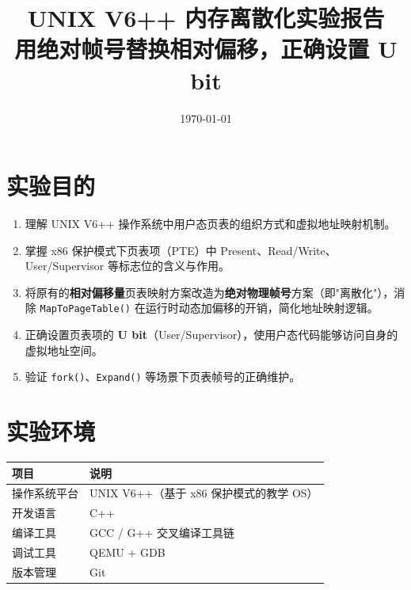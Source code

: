 \documentclass[12pt]{article}
\title{\textbf{UNIX V6++ 内存离散化实验报告} \\[0.5em]
\large 用绝对帧号替换相对偏移，正确设置 U bit}
\author{}
\date{\today}
\begin{document}
\maketitle

\section{实验目的}

\begin{enumerate}[leftmargin=2em]
    \item 理解 UNIX V6++ 操作系统中用户态页表的组织方式和虚拟地址映射机制。
    \item 掌握 x86 保护模式下页表项（PTE）中 Present、Read/Write、User/Supervisor 等标志位的含义与作用。
    \item 将原有的\textbf{相对偏移量}页表映射方案改造为\textbf{绝对物理帧号}方案（即"离散化"），消除 \texttt{MapToPageTable()} 在运行时动态加偏移的开销，简化地址映射逻辑。
    \item 正确设置页表项的 \textbf{U bit}（User/Supervisor），使用户态代码能够访问自身的虚拟地址空间。
    \item 验证 \texttt{fork()}、\texttt{Expand()} 等场景下页表帧号的正确维护。
\end{enumerate}

\section{实验环境}

\begin{table}[H]
\centering
\begin{tabular}{ll}
\toprule
\textbf{项目} & \textbf{说明} \\
\midrule
操作系统平台 & UNIX V6++（基于 x86 保护模式的教学 OS） \\
开发语言     & C++ \\
编译工具     & GCC / G++ 交叉编译工具链 \\
调试工具     & QEMU + GDB \\
版本管理     & Git \\
\bottomrule
\end{tabular}
\end{table}

\end{document}
